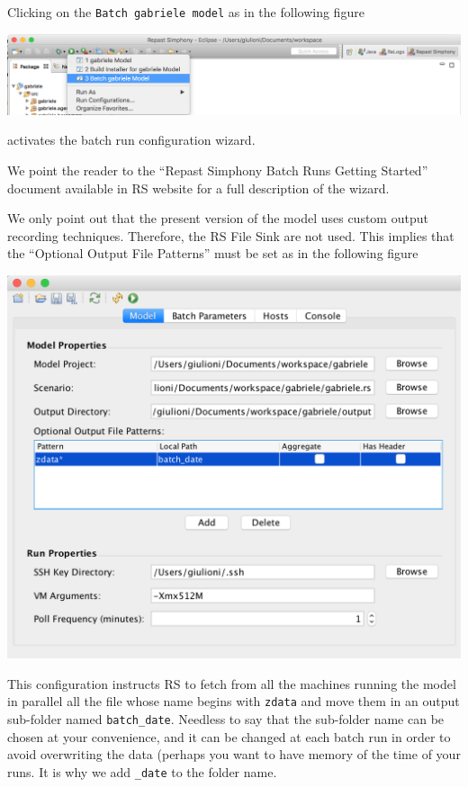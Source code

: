 \documentclass{book}
\begin{document}
Clicking on the \verb+Batch gabriele model+ as in the following figure

\noindent
\includegraphics[scale=0.35]{fig_gabriele_rs_execution3}

activates the batch run configuration wizard.

We point the reader to the ``Repast Simphony Batch Runs Getting Started'' document available in RS website for a full description of the wizard.

We only point out that the present version of the model uses custom output recording techniques. Therefore, the RS File Sink are not used. This implies that the ``Optional Output File Patterns'' must be set as in the following figure

\noindent
\includegraphics[scale=0.35]{fig_gabriele_rs_batch}

This configuration instructs RS to fetch from all the machines running the model in parallel all the file whose name begins with \verb+zdata+  and move them in an output sub-folder named 
\verb+batch_date+. Needless to say that the sub-folder name can be chosen at your convenience, and it can be changed at each batch run in order to avoid overwriting the data (perhaps you want to have memory of the time of your runs. It is why we add \verb+_date+ to the folder name.
\end{document}
